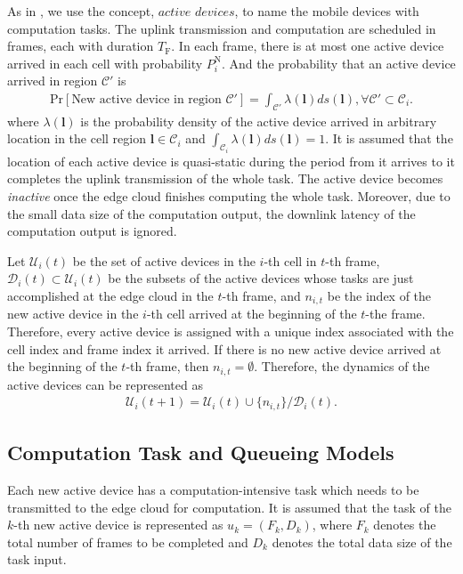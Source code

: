 \documentclass[12pt, draftclsnofoot, onecolumn]{IEEEtran}
\begin{document}
As in \cite{}, we use the concept, $\textit{active devices}$, to name the mobile devices with computation tasks. The uplink transmission and computation are scheduled in frames, each with duration $T_{\mathrm{F}}$. In each frame, there is at most one active device arrived in each cell with probability $P_{i}^{\mathrm{N}}$. And the probability that an active device arrived in region $\mathcal{C}'$ is
\begin{align}
	\mathrm{Pr}[\text{New active device in region }\mathcal{C}']=\int_{\mathcal{C}'}\lambda(\mathbf{l})ds(\mathbf{l}),\forall \mathcal{C}'\subset\mathcal{C}_{i}.
\end{align}
where $\lambda(\mathbf{l})$ is the probability density of the active device arrived in arbitrary location in the cell region $\mathbf{l}\in\mathcal{C}_{i}$ and $\int_{\mathcal{C}_{i}}\lambda(\mathbf{l})ds(\mathbf{l})=1$. It is assumed that the location of each active device is quasi-static during the period from it arrives to it completes the uplink transmission of the whole task. The active device becomes \textit{inactive} once the edge cloud finishes computing the whole task. Moreover, due to the small data size of the computation output, the downlink latency of the computation output is ignored.

Let $\mathcal{U}_{i}(t)$ be the set of active devices in the $i$-th cell in $t$-th frame, $\mathcal{D}_{i}(t)\subset\mathcal{U}_{i}(t)$ be the subsets of the active devices whose tasks are just accomplished at the edge cloud in the $t$-th frame, and $n_{i,t}$ be the index of the new active device in the $i$-th cell arrived at the beginning of the $t$-the frame. Therefore, every active device is assigned with a unique index associated with the cell index and frame index it arrived. If there is no new active device arrived at the beginning of the $t$-th frame, then $n_{i,t}=\emptyset$. Therefore, the dynamics of the active devices can be represented as
\begin{align}
	\mathcal{U}_{i}(t+1)= \mathcal{U}_{i}(t)\cup\{n_{i,t}\}/\mathcal{D}_{i}(t).
\end{align}

\subsection{Computation Task and Queueing Models}
Each new active device has a computation-intensive task which needs to be transmitted to the edge cloud for computation. It is assumed that the task of the $k$-th new active device is represented as $u_{k}=(F_{k},D_{k})$, where $F_{k}$ denotes the total number of frames to be completed and $D_{k}$ denotes the total data size of the task input.
\end{document}
